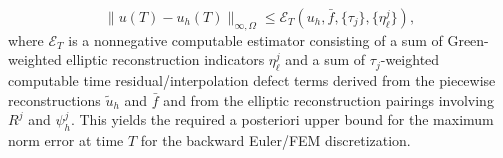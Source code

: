 \documentclass{article}
\begin{document}
\[
\|u(T)-u_h(T)\|_{\infty,\Omega} \le \mathcal E_T(u_h,\bar f,\{\tau_j\},\{\eta_{\ell}^j\}),
\]
where $\mathcal E_T$ is a nonnegative computable estimator consisting of a sum of Green-weighted elliptic reconstruction indicators $\eta_{\ell}^j$ and a sum of $\tau_j$-weighted computable time residual/interpolation defect terms derived from the piecewise reconstructions $\tilde u_h$ and $\bar f$ and from the elliptic reconstruction pairings involving $R^j$ and $\psi_h^j$. This yields the required a posteriori upper bound for the maximum norm error at time $T$ for the backward Euler/FEM discretization.
\end{document}

